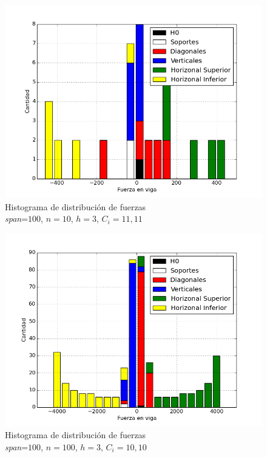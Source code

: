 \begin{figure}[h!]
\begin{center}
\includegraphics[scale=0.5]{archivos/graficos/hist_n10_C100.png}
\caption{\label{fig:hist_n10_C100}Histograma de distribución de fuerzas\\
\textit{span}=$100$, $n=10$, $h=3$, $C_i=11,11$}
\end{center}
\end{figure}

\begin{figure}[h!]
\begin{center}
\includegraphics[scale=0.5]{archivos/graficos/hist_n100_C1000.png}
\caption{\label{fig:hist_n100_C1000}Histograma de distribución de fuerzas\\
\textit{span}=$100$, $n=100$, $h=3$, $C_i=10,10$}
\end{center}
\end{figure}

